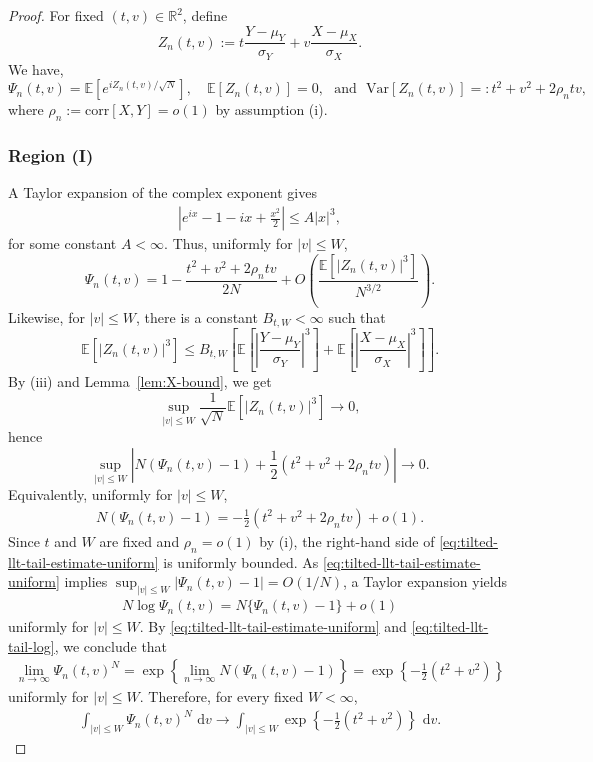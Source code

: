 \documentclass[11pt]{article}
\numberwithin{equation}{section}
\newcommand{\dd}{\,\mathrm{d}}
\newcommand{\reals}{\mathbb R}
\newcommand{\Var}[1]{\mathrm{Var}\left[ #1\right]}
\newcommand{\ex}[1]{\ensuremath{\mathbb{E}\left[ #1\right]}}
\newcommand{\Corr}[1]{\mathrm{corr} \left[#1\right]}
\begin{document}
\begin{proof}
For fixed $(t,v)\in\reals^2$, define 
\[
    Z_{n}(t,v) := t\frac{Y-\mu_Y}{\sigma_Y}+v\frac{X-\mu_X}{\sigma_X}.
\]
We have, 
\[
\Psi_n(t,v)=\ex{e^{i Z_n(t,v)/\sqrt N}},
\quad \ex{Z_n(t,v)}=0, \text{~~and~~}
\Var{Z_n(t,v)} =: t^2+v^2+2\rho_n tv,
\]
where $\rho_n := \Corr{X,Y} = o(1)$ by assumption (i).

\subsubsection*{Region (I)}
A Taylor expansion of the complex exponent gives
\begin{align}
    \label{eq:taylor-expansion}
\left|e^{ix}-1-ix+\frac{x^2}{2}\right| \le A|x|^3,
\end{align}
for some constant $A<\infty$. Thus, uniformly for $|v|\le W$,
\[
\Psi_n(t,v)
=1-\frac{t^2+v^2+2\rho_n tv}{2N}
+O\left(\frac{\ex{|Z_n(t,v)|^3}}{N^{3/2}}\right).
\]
Likewise, for $|v|\le W$, there is a constant $B_{t,W}<\infty$ such that 
\[
\ex{|Z_n(t,v)|^3}
\le
B_{t,W}\left[
\ex{\left|\frac{Y-\mu_Y}{\sigma_Y}\right|^3}
+\ex{\left|\frac{X-\mu_X}{\sigma_X}\right|^3}
\right].
\]
By (iii) and Lemma~\ref{lem:X-bound}, we get
\[
    \sup_{|v|\le W} \frac{1}{\sqrt{N}}\ex{|Z_n(t,v)|^3} \longrightarrow 0,
\]
hence
\[
\sup_{|v|\le W} \left| N(\Psi_n(t,v)-1) + \frac{1}{2} \left(t^2+v^2+2\rho_n tv\right) \right|
\longrightarrow 0.
\]
Equivalently, uniformly for $|v|\le W$,
\begin{align}
    \label{eq:tilted-llt-tail-estimate-uniform}
N(\Psi_n(t,v)-1) = -\frac{1}{2}\left(t^2+v^2+2\rho_n tv\right)+o(1).
\end{align}
Since $t$ and $W$ are fixed and $\rho_n=o(1)$ by (i), the right-hand side of 
\eqref{eq:tilted-llt-tail-estimate-uniform} is uniformly bounded. As \eqref{eq:tilted-llt-tail-estimate-uniform} implies $\sup_{|v|\le W}|\Psi_n(t,v)-1|=O(1/N)$, a Taylor expansion yields
\begin{align}
    \label{eq:tilted-llt-tail-log}
N\log\Psi_n(t,v)
=N\{\Psi_n(t,v)-1\}+o(1)
\end{align}
uniformly for $|v|\le W$. By \eqref{eq:tilted-llt-tail-estimate-uniform} and \eqref{eq:tilted-llt-tail-log}, we conclude that
\begin{align}
    \label{eq:tilted-llt-tail-estimate-uniform-I}
\lim_{n \to \infty} \Psi_n(t,v)^N
= 
\exp\left\{ \lim_{n \to \infty} N \left( \Psi_n(t,v)-1\right)\right\}
= \exp\left\{-\frac{1}{2}(t^2+v^2)\right\}
\end{align}
uniformly for $|v|\le W$. Therefore, for every fixed $W<\infty$,
\begin{align}
    \label{eq:tilted-llt-compact-limit}
\int_{|v|\le W} \Psi_n(t,v)^N\,\dd v
\longrightarrow
\int_{|v|\le W} \exp\left\{-\frac{1}{2}(t^2+v^2)\right\}\,\dd v.
\end{align}


\end{proof}
\end{document}
